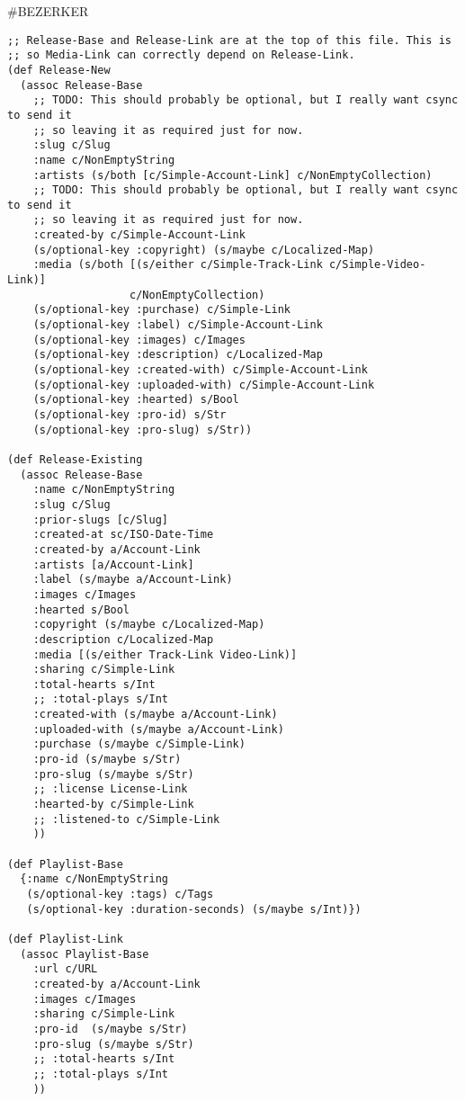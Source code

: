\documentclass[presentation, bigger]{beamer}
\begin{document}
\begin{frame}[fragile,shrink,label=sec-]{\#BEZERKER}
 \begin{verbatim}
;; Release-Base and Release-Link are at the top of this file. This is
;; so Media-Link can correctly depend on Release-Link.
(def Release-New
  (assoc Release-Base
    ;; TODO: This should probably be optional, but I really want csync to send it
    ;; so leaving it as required just for now.
    :slug c/Slug
    :name c/NonEmptyString
    :artists (s/both [c/Simple-Account-Link] c/NonEmptyCollection)
    ;; TODO: This should probably be optional, but I really want csync to send it
    ;; so leaving it as required just for now.
    :created-by c/Simple-Account-Link
    (s/optional-key :copyright) (s/maybe c/Localized-Map)
    :media (s/both [(s/either c/Simple-Track-Link c/Simple-Video-Link)]
                   c/NonEmptyCollection)
    (s/optional-key :purchase) c/Simple-Link
    (s/optional-key :label) c/Simple-Account-Link
    (s/optional-key :images) c/Images
    (s/optional-key :description) c/Localized-Map
    (s/optional-key :created-with) c/Simple-Account-Link
    (s/optional-key :uploaded-with) c/Simple-Account-Link
    (s/optional-key :hearted) s/Bool
    (s/optional-key :pro-id) s/Str
    (s/optional-key :pro-slug) s/Str))

(def Release-Existing
  (assoc Release-Base
    :name c/NonEmptyString
    :slug c/Slug
    :prior-slugs [c/Slug]
    :created-at sc/ISO-Date-Time
    :created-by a/Account-Link
    :artists [a/Account-Link]
    :label (s/maybe a/Account-Link)
    :images c/Images
    :hearted s/Bool
    :copyright (s/maybe c/Localized-Map)
    :description c/Localized-Map
    :media [(s/either Track-Link Video-Link)]
    :sharing c/Simple-Link
    :total-hearts s/Int
    ;; :total-plays s/Int
    :created-with (s/maybe a/Account-Link)
    :uploaded-with (s/maybe a/Account-Link)
    :purchase (s/maybe c/Simple-Link)
    :pro-id (s/maybe s/Str)
    :pro-slug (s/maybe s/Str)
    ;; :license License-Link
    :hearted-by c/Simple-Link
    ;; :listened-to c/Simple-Link
    ))

(def Playlist-Base
  {:name c/NonEmptyString
   (s/optional-key :tags) c/Tags
   (s/optional-key :duration-seconds) (s/maybe s/Int)})

(def Playlist-Link
  (assoc Playlist-Base
    :url c/URL
    :created-by a/Account-Link
    :images c/Images
    :sharing c/Simple-Link
    :pro-id  (s/maybe s/Str)
    :pro-slug (s/maybe s/Str)
    ;; :total-hearts s/Int
    ;; :total-plays s/Int
    ))
\end{verbatim}
\end{frame}
\end{document}

